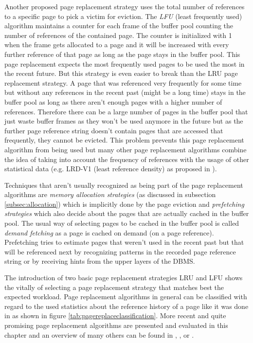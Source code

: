 	Another proposed page replacement strategy uses the total number of references to a specific page to pick a victim for eviction. The \emph{LFU} (least frequently used) algorithm maintains a counter for each frame of the buffer pool counting the number of references of the contained page. The counter is initialized with \num{1} when the frame gets allocated to a page and it will be increased with every further reference of that page as long as the page stays in the buffer pool. This page replacement expects the most frequently used pages to be used the most in the recent future. But this strategy is even easier to break than the LRU page replacement strategy. A page that was referenced very frequently for some time but without any references in the recent past (might be a long time) stays in the buffer pool as long as there aren't enough pages with a higher number of references. Therefore there can be a large number of pages in the buffer pool that just waste buffer frames as they won't be used anymore in the future but as the further page reference string doesn't contain pages that are accessed that frequently, they cannot be evicted. This problem prevents this page replacement algorithm from being used but many other page replacement algorithms combine the idea of taking into account the frequency of references with the usage of other statistical data (e.g. LRD-V1 (least reference density) as proposed in \cite{Effelsberg:1984}).
	
		Techniques that aren't usually recognized as being part of the page replacement algorithms are \emph{memory allocation strategies} (as discussed in subsection \ref{subsec:allocation}) which is implicitly done by the page eviction and \emph{prefetching strategies} which also decide about the pages that are actually cached in the buffer pool. The usual way of selecting pages to be cached in the buffer pool is called \emph{demand fetching} as a page is cached on demand (on a page reference). Prefetching tries to estimate pages that weren't used in the recent past but that will be referenced next by recognizing patterns in the recorded page reference string or by receiving hints from the upper layers of the DBMS.

	The introduction of two basic page replacement strategies LRU and LFU shows the vitally of selecting a page replacement strategy that matches best the expected workload. Page replacement algorithms in general can be classified with regard to the used statistics about the reference history of a page like it was done in \cite{Effelsberg:1984} as shown in figure \ref{tab:pagereplaceclassification}. More recent and quite promising page replacement algorithms are presented and evaluated in this chapter and an overview of many others can be found in \cite{Datenbanksysteme_-_Konzepte_und_Techniken_der_Implementierung}, \cite{Datenbanken_-_Implementierungstechniken}, \cite{Wenguang:2001} or \cite{Paajanen:2007}.
	
